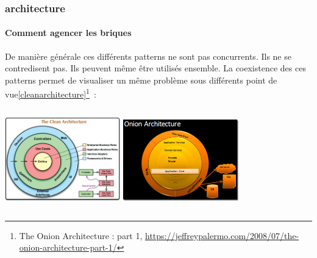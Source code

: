 \documentclass{beamer}
\begin{document}
    \begin{frame}
        \transdissolve
        \frametitle{ architecture}
        \framesubtitle{Comment agencer les briques}
        De manière générale ces différents patterns ne sont pas concurrents.
        Ils ne se contredisent pas.
        Ils peuvent même être utilisés ensemble.
        \bigbreak
        La coexistence des ces patterns permet de visualiser un même problème sous différents point de vue\cref{cleanarchitecture}\footnotestep\footnote{The Onion Architecture : part 1, \url{https://jeffreypalermo.com/2008/07/the-onion-architecture-part-1/}}~:
        \begin{columns}
            \centering
            \includegraphics[width=5cm]{image/the-clean-architecture}
            \centering
            \includegraphics[width=5cm]{image/onion-architecture}
        \end{columns}
    \end{frame}
\end{document}
